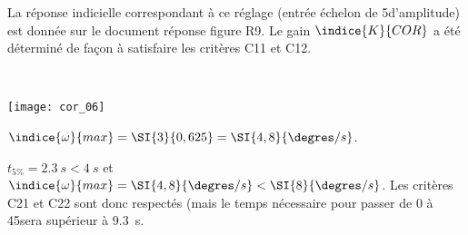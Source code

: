 La réponse indicielle correspondant à ce réglage (entrée échelon de 5\degres d’amplitude) est donnée sur le document réponse figure R9. Le gain $\indice{K}{COR}$ a été déterminé de façon à satisfaire les critères C11 et C12.

\ifprof
\begin{corrige}~\\
\begin{center}
\texttt{[image: cor\_06]}
\end{center}
$\indice{\omega}{max} = \SI{3}{0,625}=\SI{4,8}{\degres/s}$.
\end{corrige}
\else
\fi


\ifprof
\begin{corrige}

$t_{5\%}=\SI{2,3}{s}<\SI{4}{s}$ et $\indice{\omega}{max} = \SI{4,8}{\degres/s}<\SI{8}{\degres/s}$. 
Les critères C21 et C22 sont donc respectés (mais le temps nécessaire pour passer de 0 à 45\degres sera supérieur à \SI{9,3}{s}. 


\end{corrige}
\else
\fi


